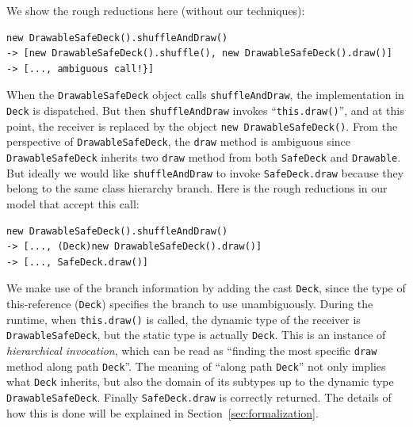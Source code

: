\noindent We show the rough reductions here (without our techniques):
\begin{lstlisting}
new DrawableSafeDeck().shuffleAndDraw() 
-> [new DrawableSafeDeck().shuffle(), new DrawableSafeDeck().draw()]
-> [..., ambiguous call!}]
\end{lstlisting}
When the \lstinline|DrawableSafeDeck| object calls \lstinline|shuffleAndDraw|, the implementation in \lstinline|Deck| is dispatched. But then \lstinline|shuffleAndDraw| invokes ``\lstinline|this.draw()|'', and at this point, the receiver 
is replaced by the object \lstinline|new DrawableSafeDeck()|.
From the perspective of \lstinline|DrawableSafeDeck|, the \lstinline|draw| method is ambiguous since \lstinline|DrawableSafeDeck| inherits two \lstinline|draw| method from both \lstinline|SafeDeck| and \lstinline|Drawable|. But ideally we would
like \lstinline|shuffleAndDraw| to invoke \lstinline|SafeDeck.draw|
because they belong to the same class hierarchy branch. Here is the rough reductions in our model that accept this call: 
\begin{lstlisting}
new DrawableSafeDeck().shuffleAndDraw() 
-> [..., (Deck)new DrawableSafeDeck().draw()]
-> [..., SafeDeck.draw()]
\end{lstlisting}
We make use of the branch information by adding the cast \lstinline|Deck|, since the type of this-reference (\lstinline|Deck|) specifies the branch to use unambiguously. 
During the runtime, when \lstinline|this.draw()| is called,
the dynamic type of the receiver is \lstinline|DrawableSafeDeck|, but the static type is actually
\lstinline|Deck|. This is an instance of \textit{hierarchical invocation}, which can be read as 
``finding the most specific \lstinline|draw| method along path \lstinline|Deck|''. The meaning of ``along path
\lstinline|Deck|'' not only implies what \lstinline|Deck| inherits, but also the domain of its subtypes up to the
dynamic type \lstinline|DrawableSafeDeck|. Finally \lstinline|SafeDeck.draw| is correctly returned. The details of how this is done will be explained in Section~\ref{sec:formalization}.


